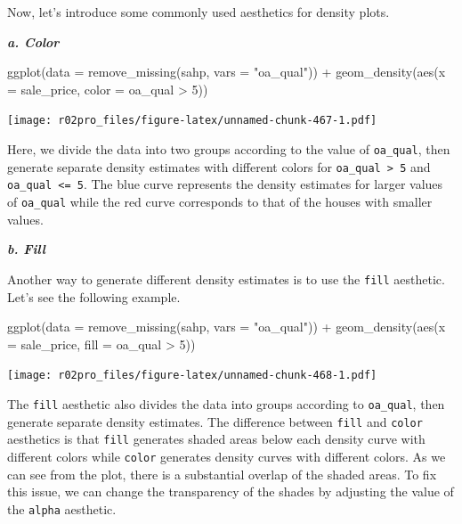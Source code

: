 \documentclass[
]{book}
\newenvironment{Shaded}{\begin{snugshade}}{\end{snugshade}}
\newcommand{\AttributeTok}[1]{\textcolor[rgb]{0.77,0.63,0.00}{#1}}
\newcommand{\DecValTok}[1]{\textcolor[rgb]{0.00,0.00,0.81}{#1}}
\newcommand{\FunctionTok}[1]{\textcolor[rgb]{0.00,0.00,0.00}{#1}}
\newcommand{\NormalTok}[1]{#1}
\newcommand{\SpecialCharTok}[1]{\textcolor[rgb]{0.00,0.00,0.00}{#1}}
\newcommand{\StringTok}[1]{\textcolor[rgb]{0.31,0.60,0.02}{#1}}
\begin{document}
Now, let's introduce some commonly used aesthetics for density plots.

\textbf{\emph{a. Color}}

\begin{Shaded}
\begin{Highlighting}[]
\FunctionTok{ggplot}\NormalTok{(}\AttributeTok{data =} \FunctionTok{remove\_missing}\NormalTok{(sahp, }\AttributeTok{vars =} \StringTok{"oa\_qual"}\NormalTok{)) }\SpecialCharTok{+}  \FunctionTok{geom\_density}\NormalTok{(}\FunctionTok{aes}\NormalTok{(}\AttributeTok{x =}\NormalTok{ sale\_price, }\AttributeTok{color =}\NormalTok{ oa\_qual }\SpecialCharTok{\textgreater{}} \DecValTok{5}\NormalTok{))}
\end{Highlighting}
\end{Shaded}

\texttt{[image: r02pro\_files/figure-latex/unnamed-chunk-467-1.pdf]}

Here, we divide the data into two groups according to the value of \texttt{oa\_qual}, then generate separate density estimates with different colors for \texttt{oa\_qual\ \textgreater{}\ 5} and \texttt{oa\_qual\ \textless{}=\ 5}. The blue curve represents the density estimates for larger values of \texttt{oa\_qual} while the red curve corresponds to that of the houses with smaller values.

\textbf{\emph{b. Fill}}

Another way to generate different density estimates is to use the \texttt{fill} aesthetic. Let's see the following example.

\begin{Shaded}
\begin{Highlighting}[]
\FunctionTok{ggplot}\NormalTok{(}\AttributeTok{data =} \FunctionTok{remove\_missing}\NormalTok{(sahp, }\AttributeTok{vars =} \StringTok{"oa\_qual"}\NormalTok{)) }\SpecialCharTok{+}  \FunctionTok{geom\_density}\NormalTok{(}\FunctionTok{aes}\NormalTok{(}\AttributeTok{x =}\NormalTok{ sale\_price, }\AttributeTok{fill =}\NormalTok{ oa\_qual }\SpecialCharTok{\textgreater{}} \DecValTok{5}\NormalTok{))}
\end{Highlighting}
\end{Shaded}

\texttt{[image: r02pro\_files/figure-latex/unnamed-chunk-468-1.pdf]}

The \texttt{fill} aesthetic also divides the data into groups according to \texttt{oa\_qual}, then generate separate density estimates. The difference between \texttt{fill} and \texttt{color} aesthetics is that \texttt{fill} generates shaded areas below each density curve with different colors while \texttt{color} generates density curves with different colors. As we can see from the plot, there is a substantial overlap of the shaded areas. To fix this issue, we can change the transparency of the shades by adjusting the value of the \texttt{alpha} aesthetic.
\end{document}
